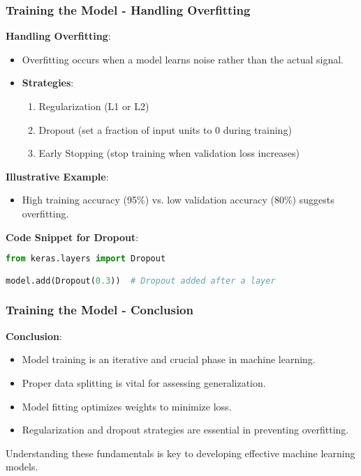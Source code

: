 \documentclass[aspectratio=169]{beamer}
\begin{document}
\begin{frame}[fragile]
    \frametitle{Training the Model - Handling Overfitting}
    \textbf{Handling Overfitting}:
    \begin{itemize}
        \item Overfitting occurs when a model learns noise rather than the actual signal.
        \item \textbf{Strategies}:
        \begin{enumerate}
            \item Regularization (L1 or L2)
            \item Dropout (set a fraction of input units to 0 during training)
            \item Early Stopping (stop training when validation loss increases)
        \end{enumerate}
    \end{itemize}
    
    \textbf{Illustrative Example}:
    \begin{itemize}
        \item High training accuracy (95\%) vs. low validation accuracy (80\%) suggests overfitting.
    \end{itemize}
    
    \textbf{Code Snippet for Dropout}:
    \begin{lstlisting}[language=Python]
from keras.layers import Dropout

model.add(Dropout(0.3))  # Dropout added after a layer
    \end{lstlisting}
\end{frame}

\begin{frame}[fragile]
    \frametitle{Training the Model - Conclusion}
    \textbf{Conclusion}:
    \begin{itemize}
        \item Model training is an iterative and crucial phase in machine learning.
        \item Proper data splitting is vital for assessing generalization.
        \item Model fitting optimizes weights to minimize loss.
        \item Regularization and dropout strategies are essential in preventing overfitting.
    \end{itemize}
    Understanding these fundamentals is key to developing effective machine learning models.
\end{frame}
\end{document}
